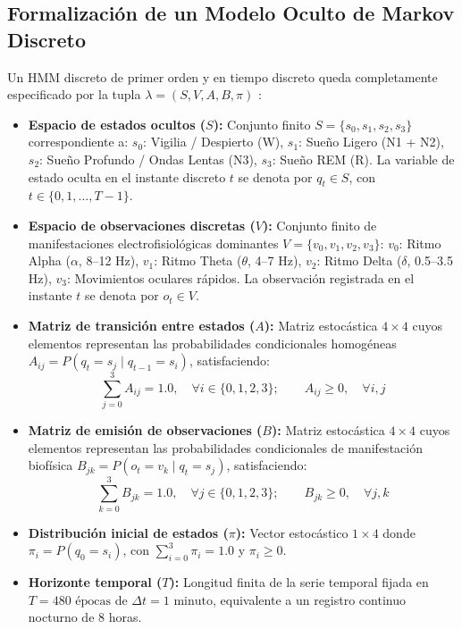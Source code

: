 \documentclass[11pt,a4paper]{article}
\begin{document}
\subsection{Formalización de un Modelo Oculto de Markov Discreto}
Un HMM discreto de primer orden y en tiempo discreto queda completamente especificado por la tupla $\lambda = (S, V, A, B, \pi)$ \cite{rabiner1989}:
\begin{itemize}[leftmargin=*,itemsep=1pt]
    \item \textbf{Espacio de estados ocultos ($S$):} Conjunto finito $S = \{s_0, s_1, s_2, s_3\}$ correspondiente a:
    $s_0$: Vigilia / Despierto (W), $s_1$: Sueño Ligero (N1 + N2), $s_2$: Sueño Profundo / Ondas Lentas (N3), $s_3$: Sueño REM (R). La variable de estado oculta en el instante discreto $t$ se denota por $q_t \in S$, con $t \in \{0, 1, \dots, T-1\}$.
    \item \textbf{Espacio de observaciones discretas ($V$):} Conjunto finito de manifestaciones electrofisiológicas dominantes $V = \{v_0, v_1, v_2, v_3\}$:
    $v_0$: Ritmo Alpha ($\alpha$, 8--12 Hz), $v_1$: Ritmo Theta ($\theta$, 4--7 Hz), $v_2$: Ritmo Delta ($\delta$, 0.5--3.5 Hz), $v_3$: Movimientos oculares rápidos. La observación registrada en el instante $t$ se denota por $o_t \in V$.
    \item \textbf{Matriz de transición entre estados ($A$):} Matriz estocástica $4 \times 4$ cuyos elementos representan las probabilidades condicionales homogéneas $A_{ij} = P(q_t = s_j \mid q_{t-1} = s_i)$, satisfaciendo:
    \begin{equation}
        \sum_{j=0}^{3} A_{ij} = 1.0, \quad \forall i \in \{0, 1, 2, 3\}; \qquad A_{ij} \ge 0, \quad \forall i, j
    \end{equation}
    \item \textbf{Matriz de emisión de observaciones ($B$):} Matriz estocástica $4 \times 4$ cuyos elementos representan las probabilidades condicionales de manifestación biofísica $B_{jk} = P(o_t = v_k \mid q_t = s_j)$, satisfaciendo:
    \begin{equation}
        \sum_{k=0}^{3} B_{jk} = 1.0, \quad \forall j \in \{0, 1, 2, 3\}; \qquad B_{jk} \ge 0, \quad \forall j, k
    \end{equation}
    \item \textbf{Distribución inicial de estados ($\pi$):} Vector estocástico $1 \times 4$ donde $\pi_i = P(q_0 = s_i)$, con $\sum_{i=0}^3 \pi_i = 1.0$ y $\pi_i \ge 0$.
    \item \textbf{Horizonte temporal ($T$):} Longitud finita de la serie temporal fijada en $T = 480\text{ épocas}$ de $\Delta t = 1\text{ minuto}$, equivalente a un registro continuo nocturno de 8 horas.
\end{itemize}
\end{document}
